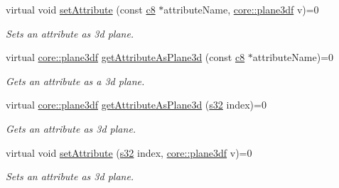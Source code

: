 \begin{DoxyCompactItemize}
\mbox{\label{classirr_1_1io_1_1IAttributes_a6a4cb4cb9c5296fc05892f0821009609}} 
virtual void \hyperlink{classirr_1_1io_1_1IAttributes_a6a4cb4cb9c5296fc05892f0821009609}{set\+Attribute} (const \hyperlink{namespaceirr_a9395eaea339bcb546b319e9c96bf7410}{c8} $\ast$attribute\+Name, \hyperlink{namespaceirr_1_1core_a97c9b39d4c6f71dbd9ded0153c4fa7f7}{core\+::plane3df} v)=0
\begin{DoxyCompactList}\small\item\em Sets an attribute as 3d plane. \end{DoxyCompactList}\item 
virtual \hyperlink{namespaceirr_1_1core_a97c9b39d4c6f71dbd9ded0153c4fa7f7}{core\+::plane3df} \hyperlink{classirr_1_1io_1_1IAttributes_a1d660e66f832cd670a47f5898bc0f5df}{get\+Attribute\+As\+Plane3d} (const \hyperlink{namespaceirr_a9395eaea339bcb546b319e9c96bf7410}{c8} $\ast$attribute\+Name)=0
\begin{DoxyCompactList}\small\item\em Gets an attribute as a 3d plane. \end{DoxyCompactList}\item 
virtual \hyperlink{namespaceirr_1_1core_a97c9b39d4c6f71dbd9ded0153c4fa7f7}{core\+::plane3df} \hyperlink{classirr_1_1io_1_1IAttributes_adcb6bc5b7d76f8299b587b34b7dfaeee}{get\+Attribute\+As\+Plane3d} (\hyperlink{namespaceirr_ac66849b7a6ed16e30ebede579f9b47c6}{s32} index)=0
\begin{DoxyCompactList}\small\item\em Gets an attribute as 3d plane. \end{DoxyCompactList}\item 
\mbox{\label{classirr_1_1io_1_1IAttributes_a51277b8aa2971cb070ab9ebfadf586a1}} 
virtual void \hyperlink{classirr_1_1io_1_1IAttributes_a51277b8aa2971cb070ab9ebfadf586a1}{set\+Attribute} (\hyperlink{namespaceirr_ac66849b7a6ed16e30ebede579f9b47c6}{s32} index, \hyperlink{namespaceirr_1_1core_a97c9b39d4c6f71dbd9ded0153c4fa7f7}{core\+::plane3df} v)=0
\begin{DoxyCompactList}\small\item\em Sets an attribute as 3d plane. \end{DoxyCompactList}\item 
\mbox{\label{classirr_1_1io_1_1IAttributes_a0f27f971247a14b10945bade9534b045}} 

\end{DoxyCompactItemize}
